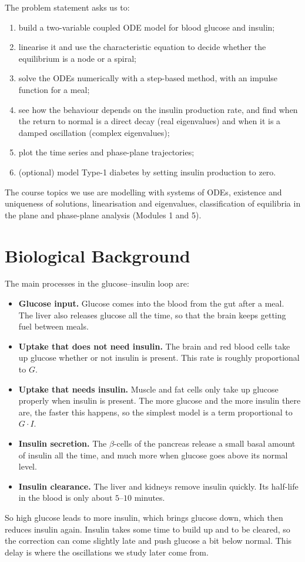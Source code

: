 \documentclass[11pt,a4paper]{article}
\begin{document}
The problem statement asks us to:
\begin{enumerate}
\item build a two-variable coupled ODE model for blood glucose and insulin;
\item linearise it and use the characteristic equation to decide whether the equilibrium is a node or a spiral;
\item solve the ODEs numerically with a step-based method, with an impulse function for a meal;
\item see how the behaviour depends on the insulin production rate, and find when the return to normal is a direct decay (real eigenvalues) and when it is a damped oscillation (complex eigenvalues);
\item plot the time series and phase-plane trajectories;
\item (optional) model Type-1 diabetes by setting insulin production to zero.
\end{enumerate}

The course topics we use are modelling with systems of ODEs, existence and uniqueness of solutions, linearisation and eigenvalues, classification of equilibria in the plane and phase-plane analysis (Modules 1 and 5).

\section{Biological Background}

The main processes in the glucose--insulin loop are:
\begin{itemize}
\item \textbf{Glucose input.} Glucose comes into the blood from the gut after a meal. The liver also releases glucose all the time, so that the brain keeps getting fuel between meals.
\item \textbf{Uptake that does not need insulin.} The brain and red blood cells take up glucose whether or not insulin is present. This rate is roughly proportional to $G$.
\item \textbf{Uptake that needs insulin.} Muscle and fat cells only take up glucose properly when insulin is present. The more glucose and the more insulin there are, the faster this happens, so the simplest model is a term proportional to $G\cdot I$.
\item \textbf{Insulin secretion.} The $\beta$-cells of the pancreas release a small basal amount of insulin all the time, and much more when glucose goes above its normal level.
\item \textbf{Insulin clearance.} The liver and kidneys remove insulin quickly. Its half-life in the blood is only about $5$--$10$ minutes.
\end{itemize}
So high glucose leads to more insulin, which brings glucose down, which then reduces insulin again. Insulin takes some time to build up and to be cleared, so the correction can come slightly late and push glucose a bit below normal. This delay is where the oscillations we study later come from.
\end{document}
